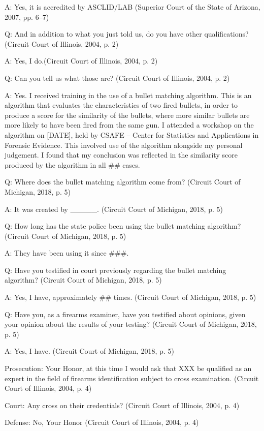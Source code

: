 \documentclass[print]{nuthesis}
\begin{document}
A: Yes, it is accredited by ASCLID/LAB (Superior Court of the State of Arizona, 2007, pp. 6--7)

Q: And in addition to what you just told us, do you have other qualifications? (Circuit Court of Illinois, 2004, p. 2)

A: Yes, I do.(Circuit Court of Illinois, 2004, p. 2)

Q: Can you tell us what those are? (Circuit Court of Illinois, 2004, p. 2)

A: Yes. I received training in the use of a bullet matching algorithm.
This is an algorithm that evaluates the characteristics of two fired bullets, in order to produce a score for the similarity of the bullets, where more similar bullets are more likely to have been fired from the same gun.
I attended a workshop on the algorithm on {[}DATE{]}, held by CSAFE -- Center for Statistics and Applications in Forensic Evidence.
This involved use of the algorithm alongside my personal judgement.
I found that my conclusion was reflected in the similarity score produced by the algorithm in all \#\# cases.

Q: Where does the bullet matching algorithm come from? (Circuit Court of Michigan, 2018, p. 5)

A: It was created by \_\_\_\_\_. (Circuit Court of Michigan, 2018, p. 5)

Q: How long has the state police been using the bullet matching algorithm? (Circuit Court of Michigan, 2018, p. 5)

A: They have been using it since \#\#\#.

Q: Have you testified in court previously regarding the bullet matching algorithm? (Circuit Court of Michigan, 2018, p. 5)

A: Yes, I have, approximately \#\# times. (Circuit Court of Michigan, 2018, p. 5)

Q: Have you, as a firearms examiner, have you testified about opinions, given your opinion about the results of your testing? (Circuit Court of Michigan, 2018, p. 5)

A: Yes, I have. (Circuit Court of Michigan, 2018, p. 5)

Prosecution: Your Honor, at this time I would ask that XXX be qualified as an expert in the field of firearms identification subject to cross examination. (Circuit Court of Illinois, 2004, p. 4)

Court: Any cross on their credentials? (Circuit Court of Illinois, 2004, p. 4)

Defense: No, Your Honor (Circuit Court of Illinois, 2004, p. 4)
\end{document}
